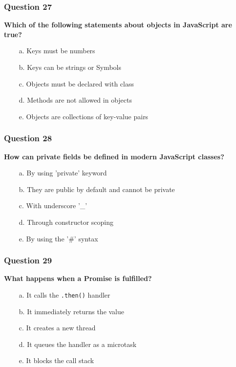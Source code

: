 \documentclass{article}
\newcommand{\cmark}{\textcolor{green}{\ding{51}}} %
\newcommand{\xmark}{\textcolor{red}{\ding{55}}}   %
\begin{document}
\subsubsection*{Question 27}
\textbf{Which of the following statements about objects in JavaScript are true?}

\begin{itemize}
  \item[\xmark\ a.] Keys must be numbers
  \item[\cmark\ b.] Keys can be strings or Symbols
  \item[\xmark\ c.] Objects must be declared with class
  \item[\xmark\ d.] Methods are not allowed in objects
  \item[\cmark\ e.] Objects are collections of key-value pairs
\end{itemize}

\subsubsection*{Question 28}
\textbf{How can private fields be defined in modern JavaScript classes?}

\begin{itemize}
  \item[\xmark\ a.] By using 'private' keyword
  \item[\xmark\ b.] They are public by default and cannot be private
  \item[\xmark\ c.] With underscore '\_'
  \item[\xmark\ d.] Through constructor scoping
  \item[\cmark\ e.] By using the '\#' syntax
\end{itemize}

\subsubsection*{Question 29}
\textbf{What happens when a Promise is fulfilled?}

\begin{itemize}
  \item[\cmark\ a.] It calls the \texttt{.then()} handler
  \item[\xmark\ b.] It immediately returns the value
  \item[\xmark\ c.] It creates a new thread
  \item[\cmark\ d.] It queues the handler as a microtask
  \item[\xmark\ e.] It blocks the call stack
\end{itemize}
\end{document}
